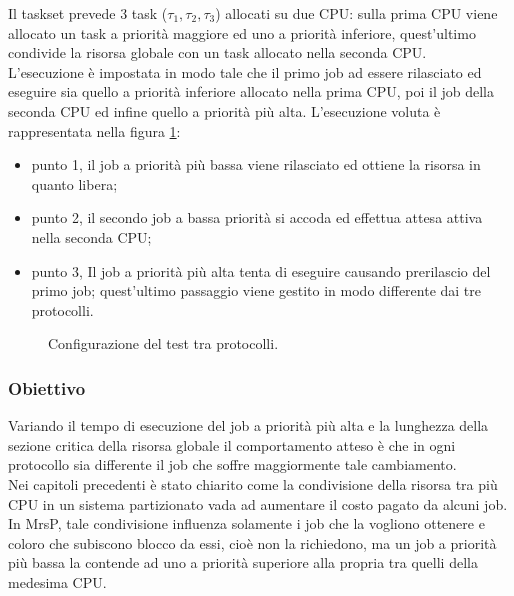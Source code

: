 \noindent Il taskset prevede 3 task ($\tau_1, \tau_2, \tau_3$) allocati su due CPU: sulla prima CPU viene allocato un task a priorità maggiore ed uno a priorità inferiore, quest'ultimo condivide la risorsa globale con un task allocato nella seconda CPU.\\

\noindent L'esecuzione è impostata in modo tale che il primo job ad essere rilasciato ed eseguire sia quello a priorità inferiore allocato nella prima CPU, poi il job della seconda CPU ed infine quello a priorità più alta. L'esecuzione voluta è rappresentata nella figura \ref{fig:test_protocols}: 

\begin{itemize}
  \item punto {\color{red} 1}, il job a priorità più bassa viene rilasciato ed ottiene la risorsa in quanto libera;
  \item punto {\color{red} 2}, il secondo job a bassa priorità si accoda ed effettua attesa attiva nella seconda CPU;
  \item punto {\color{red} 3}, Il job a priorità più alta tenta di eseguire causando prerilascio del primo job; quest'ultimo passaggio viene gestito in modo differente dai tre protocolli.\\
\end{itemize}

\begin{figure}
\centering
{}
\caption{Configurazione del test tra protocolli.}
\label{fig:test_protocols}
\end{figure}

\subsubsection{Obiettivo}
\label{sec:confronto_protocolli_ob}

\noindent Variando il tempo di esecuzione del job a priorità più alta e la lunghezza della sezione critica della risorsa globale il comportamento atteso è che in ogni protocollo sia differente il job che soffre maggiormente tale cambiamento.\\

\noindent Nei capitoli precedenti è stato chiarito come la condivisione della risorsa tra più CPU in un sistema partizionato vada ad aumentare il costo pagato da alcuni job. In MrsP, tale condivisione influenza solamente i job che la vogliono ottenere e coloro che subiscono blocco da essi, cioè non la richiedono, ma un job a priorità più bassa la contende ad uno a priorità superiore alla propria tra quelli della medesima CPU.\\

